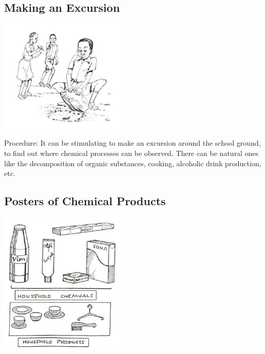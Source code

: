 \begin{multicols}{2}
\subsection{Making an Excursion}

\begin{center}
\includegraphics[width=0.45\textwidth]{./img/source/excursion.jpg}
\end{center}

\begin{description*}
\item[Procedure:]{It can be stimulating to make an excursion
around the school ground, to find out where
chemical processes can be observed. There can
be natural ones like the decomposition of organic
substances, cooking, alcoholic drink
production, etc.}
\end{description*}

\subsection{Posters of Chemical Products}

\begin{center}
\includegraphics[width=0.45\textwidth]{./img/source/chemical-posters.jpg}
\end{center}


\end{multicols}
